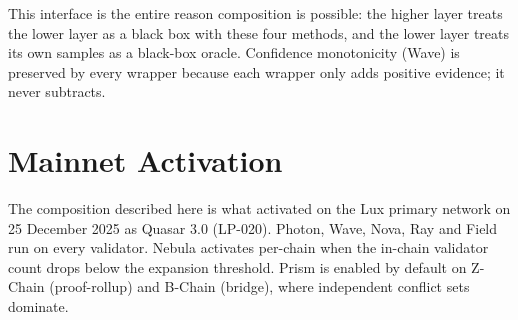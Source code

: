 This interface is the entire reason composition is possible: the higher
layer treats the lower layer as a black box with these four methods,
and the lower layer treats its own samples as a black-box oracle.
Confidence monotonicity (Wave) is preserved by every wrapper because
each wrapper only adds positive evidence; it never subtracts.

\section{Mainnet Activation}

The composition described here is what activated on the Lux primary
network on 25 December 2025 as Quasar 3.0 (LP-020). Photon, Wave, Nova,
Ray and Field run on every validator. Nebula activates per-chain when
the in-chain validator count drops below the expansion threshold.
Prism is enabled by default on Z-Chain (proof-rollup) and B-Chain
(bridge), where independent conflict sets dominate.

